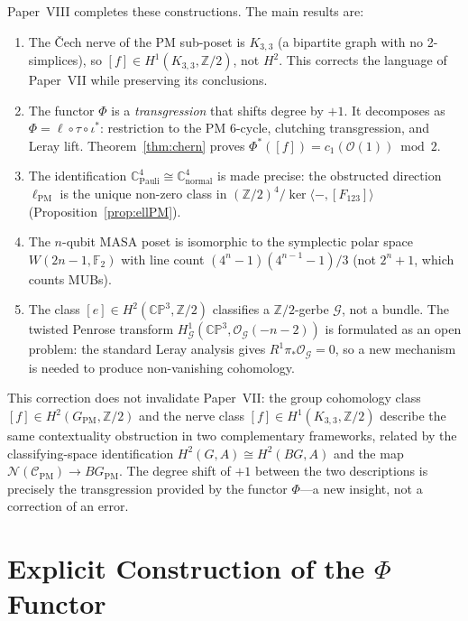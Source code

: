 \documentclass[11pt,a4paper]{article}
\theoremstyle{remark}
\newcommand{\CP}{\mathbb{CP}}
\newcommand{\C}{\mathbb{C}}
\newcommand{\Z}{\mathbb{Z}}
\newcommand{\cO}{\mathcal{O}}
\newcommand{\cC}{\mathcal{C}}
\newcommand{\cN}{\mathcal{N}}
\newcommand{\cG}{\mathcal{G}}
\begin{document}
Paper~VIII completes these constructions. The main results are:

\begin{enumerate}
  \item The \v{C}ech nerve of the PM sub-poset is $K_{3,3}$ (a bipartite
    graph with no 2-simplices), so $[f] \in H^1(K_{3,3}, \Z/2)$, not $H^2$.
    This corrects the language of Paper~VII while preserving its conclusions.
  \item The functor $\Phi$ is a \emph{transgression} that shifts degree by
    $+1$. It decomposes as $\Phi = \ell \circ \tau \circ \iota^*$: restriction
    to the PM 6-cycle, clutching transgression, and Leray lift.
    Theorem~\ref{thm:chern} proves $\Phi^*([f]) = c_1(\cO(1)) \bmod 2$.
  \item The identification $\C^4_{\text{Pauli}} \cong \C^4_{\text{normal}}$
    is made precise: the obstructed direction $\ell_{\text{PM}}$ is the
    unique non-zero class in $(\Z/2)^4 / \ker \langle -, [F_{123}] \rangle$
    (Proposition~\ref{prop:ellPM}).
  \item The $n$-qubit MASA poset is isomorphic to the symplectic polar
    space $W(2n-1, \mathbb{F}_2)$ with line count
    $(4^n-1)(4^{n-1}-1)/3$ (not $2^n+1$, which counts MUBs).
  \item The class $[e] \in H^2(\CP^3, \Z/2)$ classifies a $\Z/2$-gerbe
    $\cG$, not a bundle. The twisted Penrose transform
    $H^1_{\cG}(\CP^3, \cO_{\cG}(-n-2))$ is formulated as an open problem:
    the standard Leray analysis gives $R^1\pi_*\cO_{\cG} = 0$, so a new
    mechanism is needed to produce non-vanishing cohomology.
\end{enumerate}

This correction does not invalidate Paper~VII: the group cohomology class
$[f] \in H^2(G_{\text{PM}}, \Z/2)$ and the nerve class
$[f] \in H^1(K_{3,3}, \Z/2)$ describe the same contextuality obstruction
in two complementary frameworks, related by the classifying-space
identification $H^2(G, A) \cong H^2(BG, A)$ and the map
$\cN(\cC_{\text{PM}}) \to BG_{\text{PM}}$. The degree shift of $+1$
between the two descriptions is precisely the transgression provided by
the functor $\Phi$---a new insight, not a correction of an error.

\section{Explicit Construction of the $\Phi$ Functor}
\label{sec:phi}
\end{document}
